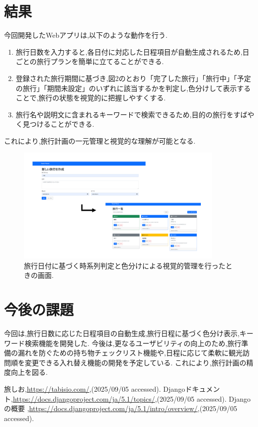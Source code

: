 \documentclass[a4j,twocolumn]{jsarticle}
\begin{document}
\section{結果}
\label{sec:org4d5127e}
今回開発したWebアプリは,以下のような動作を行う.

\begin{enumerate}
\item 旅行日数を入力すると,各日付に対応した日程項目が自動生成されるため,日ごとの旅行プランを簡単に立てることができる.
\item 登録された旅行期間に基づき,図2のとおり「完了した旅行」「旅行中」「予定の旅行」「期間未設定」のいずれに該当するかを判定し,色分けして表示することで,旅行の状態を視覚的に把握しやすくする.
\item 旅行名や説明文に含まれるキーワードで検索できるため,目的の旅行をすばやく見つけることができる.
\end{enumerate}
これにより,旅行計画の一元管理と視覚的な理解が可能となる.

\begin{figure}[htbp]
\centering
\includegraphics[width=10cm]{./figs/trip1.png}
\caption{\label{fig:orgfd927ef}旅行日付に基づく時系列判定と色分けによる視覚的管理を行ったときの画面.}
\end{figure}


\section{今後の課題}
\label{sec:orgf8ab5b0}
今回は,旅行日数に応じた日程項目の自動生成,旅行日程に基づく色分け表示,キーワード検索機能を開発した.
今後は,更なるユーザビリティの向上のため,旅行準備の漏れを防ぐための持ち物チェックリスト機能や,日程に応じて柔軟に観光訪問順を変更できる入れ替え機能の開発を予定している.
これにより,旅行計画の精度向上を図る.


\small\setlength\baselineskip{10pt}
\begin{thebibliography}{9}

 旅しお,\url{https://tabisio.com/},(2025/09/05 accessed).
Djangoドキュメント,\url{https://docs.djangoproject.com/ja/5.1/topics/},(2025/09/05 accessed).
Djangoの概要 ,\url{https://docs.djangoproject.com/ja/5.1/intro/overview/},(2025/09/05 accessed).
\end{thebibliography}
\end{document}
